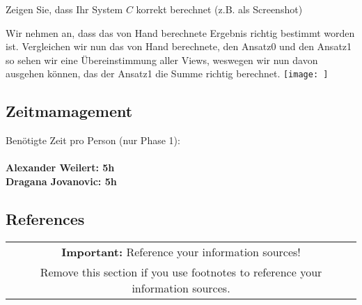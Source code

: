 \documentclass[11pt]{scrartcl}
\begin{document}
Zeigen Sie, dass Ihr System $C$ korrekt berechnet (z.B. als Screenshot)

Wir nehmen an, dass das von Hand berechnete Ergebnis richtig bestimmt worden ist.
Vergleichen wir nun das von Hand berechnete, den Ansatz0 und den Ansatz1 so sehen wir eine Übereinstimmung aller Views, weswegen wir nun davon ausgehen können, das der Ansatz1 die Summe richtig berechnet.
\texttt{[image: ]}

\subsection*{Zeitmamagement}

Benötigte Zeit pro Person (nur Phase 1): \\ \\
\textbf{Alexander Weilert: 5h} \\
\textbf{Dragana Jovanovic: 5h}

\subsection*{References}

\begin{table}[H]
  \centering
  \begin{tabular}{c}
    \hline
    \textbf{Important:} Reference your information sources! \tabularnewline
    Remove this section if you use footnotes to reference your information sources.\tabularnewline
    \hline
  \end{tabular}
\end{table}
\end{document}
